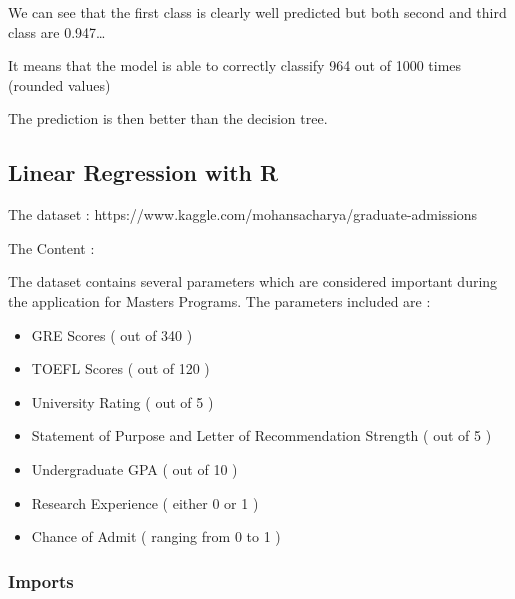 \documentclass[11pt]{article}
\providecommand{\tightlist}{%
      \setlength{\itemsep}{0pt}\setlength{\parskip}{0pt}}
\begin{document}
    We can see that the first class is clearly well predicted but both
second and third class are 0.947\ldots{}

It means that the model is able to correctly classify 964 out of 1000
times (rounded values)

The prediction is then better than the decision tree.

    \hypertarget{linear-regression-with-r}{%
\subsection{Linear Regression with R}\label{linear-regression-with-r}}

    The dataset : https://www.kaggle.com/mohansacharya/graduate-admissions

The Content :

The dataset contains several parameters which are considered important
during the application for Masters Programs. The parameters included are
:

\begin{itemize}
\tightlist
\item
  GRE Scores ( out of 340 )
\item
  TOEFL Scores ( out of 120 )
\item
  University Rating ( out of 5 )
\item
  Statement of Purpose and Letter of Recommendation Strength ( out of 5
  )
\item
  Undergraduate GPA ( out of 10 )
\item
  Research Experience ( either 0 or 1 )
\item
  Chance of Admit ( ranging from 0 to 1 )
\end{itemize}

\hypertarget{imports}{%
\subsubsection{Imports}\label{imports}}
\end{document}
